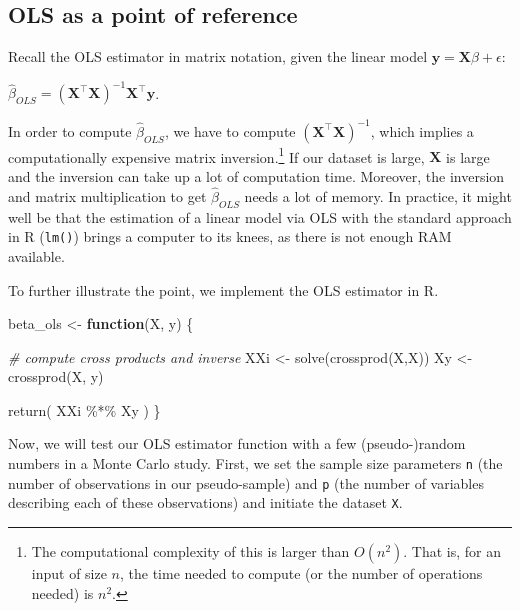 \documentclass[
  12pt,
]{style/krantz}
\newenvironment{Shaded}{\begin{snugshade}}{\end{snugshade}}
\newcommand{\CommentTok}[1]{\textcolor[rgb]{0.56,0.35,0.01}{\textit{#1}}}
\newcommand{\ControlFlowTok}[1]{\textcolor[rgb]{0.13,0.29,0.53}{\textbf{#1}}}
\newcommand{\FunctionTok}[1]{\textcolor[rgb]{0.00,0.00,0.00}{#1}}
\newcommand{\NormalTok}[1]{#1}
\newcommand{\OtherTok}[1]{\textcolor[rgb]{0.56,0.35,0.01}{#1}}
\newcommand{\SpecialCharTok}[1]{\textcolor[rgb]{0.00,0.00,0.00}{#1}}
\begin{document}
\hypertarget{ols-as-a-point-of-reference}{%
\subsection{OLS as a point of reference}\label{ols-as-a-point-of-reference}}

Recall the OLS estimator in matrix notation, given the linear model \(\mathbf{y}=\mathbf{X}\beta + \epsilon\):

\(\hat{\beta}_{OLS} = (\mathbf{X}^\intercal\mathbf{X})^{-1}\mathbf{X}^{\intercal}\mathbf{y}\).

In order to compute \(\hat{\beta}_{OLS}\), we have to compute \((\mathbf{X}^\intercal\mathbf{X})^{-1}\), which implies a computationally expensive matrix inversion.\footnote{The computational complexity of this is larger than \(O(n^{2})\). That is, for an input of size \(n\), the time needed to compute (or the number of operations needed) is \(n^2\).} If our dataset is large, \(\mathbf{X}\) is large and the inversion can take up a lot of computation time. Moreover, the inversion and matrix multiplication to get \(\hat{\beta}_{OLS}\) needs a lot of memory. In practice, it might well be that the estimation of a linear model via OLS with the standard approach in R (\texttt{lm()}) brings a computer to its knees, as there is not enough RAM available.

To further illustrate the point, we implement the OLS estimator in R.

\begin{Shaded}
\begin{Highlighting}[]
\NormalTok{beta\_ols }\OtherTok{\textless{}{-}} 
     \ControlFlowTok{function}\NormalTok{(X, y) \{}
          
          \CommentTok{\# compute cross products and inverse}
\NormalTok{          XXi }\OtherTok{\textless{}{-}} \FunctionTok{solve}\NormalTok{(}\FunctionTok{crossprod}\NormalTok{(X,X))}
\NormalTok{          Xy }\OtherTok{\textless{}{-}} \FunctionTok{crossprod}\NormalTok{(X, y) }
          
          \FunctionTok{return}\NormalTok{( XXi  }\SpecialCharTok{\%*\%}\NormalTok{ Xy )}
\NormalTok{     \}}
\end{Highlighting}
\end{Shaded}

Now, we will test our OLS estimator function with a few (pseudo-)random numbers in a Monte Carlo study. First, we set the sample size parameters \texttt{n} (the number of observations in our pseudo-sample) and \texttt{p} (the number of variables describing each of these observations) and initiate the dataset \texttt{X}.
\end{document}
